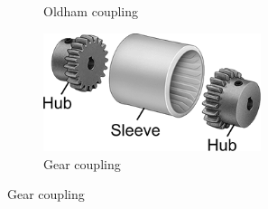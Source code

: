 \begin{figure}[H]
\begin{subfigure}[b]{.24\linewidth}
			\caption{Oldham coupling}
		\end{subfigure}
		\begin{subfigure}[b]{.24\linewidth}
			\includegraphics[width=0.7\textwidth]{imgs/coupling_gear.png}
			\caption{Gear coupling}
		\end{subfigure}
		

\end{figure}
